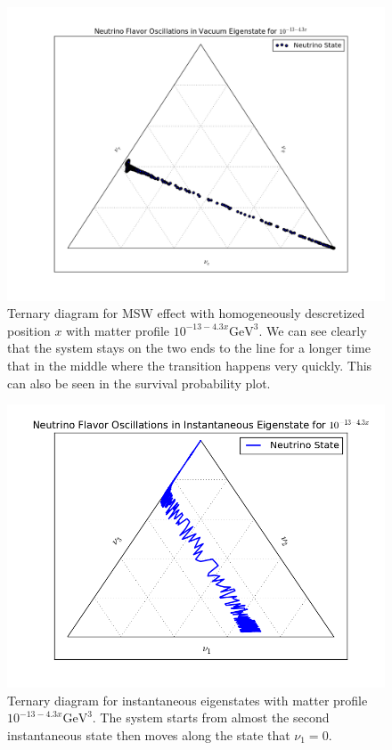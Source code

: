 \documentclass[letterpaper,12pt,english]{sphinxmanual}
\begin{document}
\begin{figure}[htbp]
\centering
\capstart

\includegraphics{mass-1-scatter.png}
\caption{Ternary diagram for MSW effect with homogeneously descretized position \(x\) with matter profile \(10^{-13-4.3x}\mathrm{GeV^3}\). We can see clearly that the system stays on the two ends to the line for a longer time that in the middle where the transition happens very quickly. This can also be seen in the survival probability plot.}\end{figure}
\begin{figure}[htbp]
\centering
\capstart

\includegraphics{matter-inst-eigen-e-1.png}
\caption{Ternary diagram for instantaneous eigenstates with matter profile \(10^{-13-4.3x}\mathrm{GeV^3}\). The system starts from almost the second instantaneous state then moves along the state that \(\nu_1=0\).}\end{figure}
\end{document}
